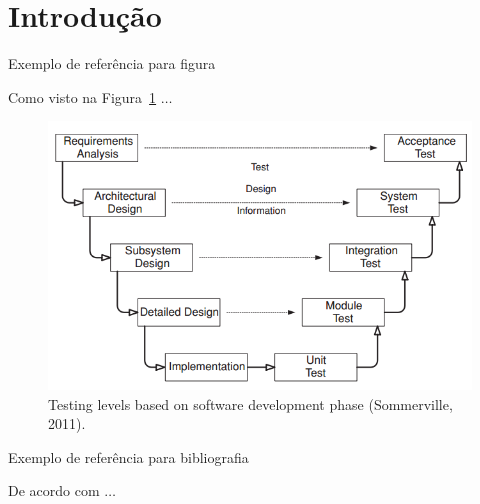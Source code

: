 \newpage
\section{Introdução}
\label{sec:introducao}

Exemplo de referência para figura

Como visto na Figura~\ref{fig:lifecycle_phase} $\ldots$

\begin{figure}[ht]
    \center
    \includegraphics[scale=0.7]{images/lifecycle_phase.png}
    \caption{Testing levels based on software development phase (Sommerville, 2011).}
    \label{fig:lifecycle_phase}
\end{figure}

Exemplo de referência para bibliografia

De acordo com \cite{sommerville2011software} $\ldots$
